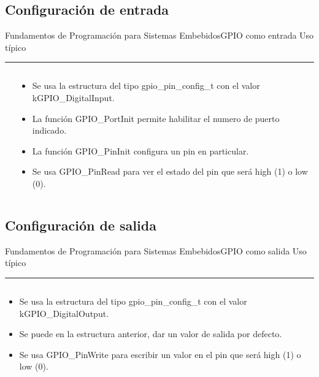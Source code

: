 \documentclass[aspectratio=169, xcolor=dvipsnames]{beamer}
\begin{document}
\subsection{Configuración de entrada}
\begin{frame}{Fundamentos de Programación para Sistemas Embebidos}{GPIO como entrada}
Uso típico
\noindent\rule{\textwidth}{0.5pt}
\begin{columns}
\begin{column}{0.55\textwidth}

\end{column}
\begin{column}{0.45\textwidth}
\begin{itemize}
    \item Se usa la estructura del tipo \textcolor{myblue}{gpio\_pin\_config\_t} con el valor \textcolor{myblue}{kGPIO\_DigitalInput}.
    \item La función \textcolor{myblue}{GPIO\_PortInit} permite habilitar el numero de puerto indicado.
    \item La función \textcolor{myblue}{GPIO\_PinInit} configura un pin en particular.
    \item Se usa \textcolor{myblue}{GPIO\_PinRead} para ver el estado del pin que será high (1) o low (0).
\end{itemize}
\end{column}
\end{columns}
\end{frame}

\subsection{Configuración de salida}
\begin{frame}{Fundamentos de Programación para Sistemas Embebidos}{GPIO como salida}
Uso típico
\noindent\rule{\textwidth}{0.5pt}
\begin{columns}
\begin{column}{0.4\textwidth}
\begin{itemize}
    \item Se usa la estructura del tipo \textcolor{myblue}{gpio\_pin\_config\_t} con el valor \textcolor{myblue}{kGPIO\_DigitalOutput}.
    \item Se puede en la estructura anterior, dar un valor de salida por defecto.
    \item Se usa \textcolor{myblue}{GPIO\_PinWrite} para escribir un valor en el pin que será high (1) o low (0).
\end{itemize}
\end{column}
\begin{column}{0.6\textwidth}

\end{column}
\end{columns}
\end{frame}
\end{document}
